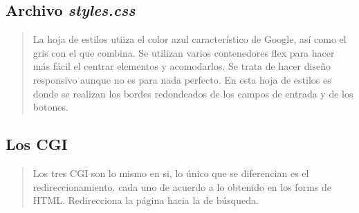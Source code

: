 \documentclass{article}
\begin{document}
  \subsection{Archivo \textit{styles.css}}

  

  \begin{quote}
    La hoja de estilos utiiza el color azul característico de Google, así como el gris con el que combina. Se utilizan varios contenedores flex para hacer más fácil el centrar elementos y acomodarlos. Se trata de hacer diseño responsivo aunque no es para nada perfecto. En esta hoja de estilos es donde se realizan los bordes redondeados de los campos de entrada y de los botones.
  \end{quote}

  \subsection{Los CGI}

  
  
  

  \begin{quote}
    Los tres CGI son lo mismo en si, lo único que se diferencian es el redireccionamiento. cada uno de acuerdo a lo obtenido en los forms de HTML. Redirecciona la página hacia la de búsqueda.
  \end{quote}


\clearpage
	
%
%
%
			
\end{document}
